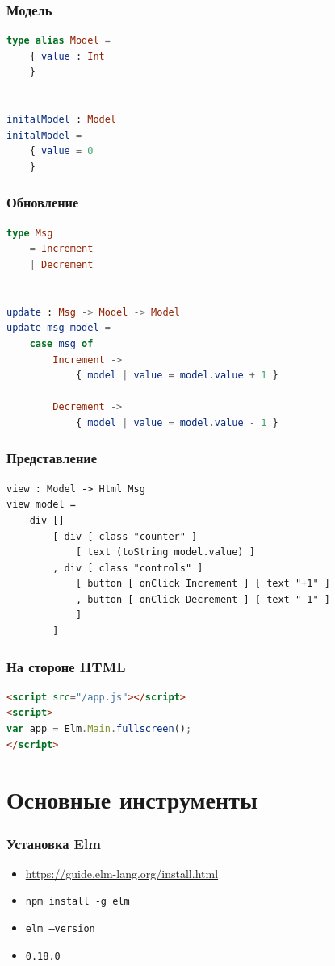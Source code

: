 \documentclass[11pt,aspectratio=169]{beamer}
\begin{document}
\begin{frame}[fragile]
\frametitle{Модель}
\begin{lstlisting}[language=elm]
type alias Model =
    { value : Int
    }


initalModel : Model
initalModel =
    { value = 0
    }
\end{lstlisting}
\end{frame}

\begin{frame}[fragile]
\frametitle{Обновление}
\begin{lstlisting}[language=elm]
type Msg
    = Increment
    | Decrement


update : Msg -> Model -> Model
update msg model =
    case msg of
        Increment ->
            { model | value = model.value + 1 }

        Decrement ->
            { model | value = model.value - 1 }
\end{lstlisting}
\end{frame}

\begin{frame}[fragile]
\frametitle{Представление}
\begin{lstlisting}
view : Model -> Html Msg
view model =
    div []
        [ div [ class "counter" ]
            [ text (toString model.value) ]
        , div [ class "controls" ]
            [ button [ onClick Increment ] [ text "+1" ]
            , button [ onClick Decrement ] [ text "-1" ]
            ]
        ]
\end{lstlisting}
\end{frame}

\begin{frame}[fragile]
\frametitle{На стороне HTML}
\begin{lstlisting}[language=HTML]
<script src="/app.js"></script>
<script>
var app = Elm.Main.fullscreen();
</script>
\end{lstlisting}
\end{frame}

\section{Основные инструменты}

\begin{frame}
\frametitle{Установка Elm}
\begin{itemize}
	\item \url{https://guide.elm-lang.org/install.html}
	\item \texttt{npm install -g elm}
	\item \texttt{elm --version}
	\item \texttt{0.18.0}
\end{itemize}
\end{frame}
\end{document}
